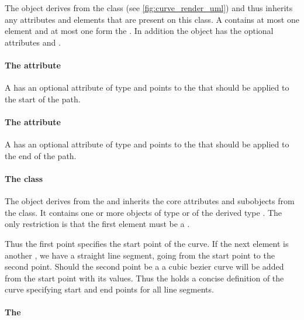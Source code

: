 The \RenderCurve object derives from the \GraphicalPrimitiveOneD class (see \ref{fig:curve_render_uml})
and thus inherits any attributes and elements that are present on this
class.
A \RenderCurve contains at most one \ListOfElements element and at most one  form the \LayoutPackage.
In addition the \RenderCurve object has the optional attributes  and .

\paragraph{The \fixttspace{} attribute}

A \RenderCurve has an optional attribute  of type
 and points to the \LineEnding that should be applied to the start of the path.

\paragraph{The \fixttspace{} attribute}

A \RenderCurve has an optional attribute  of type
 and points to the \LineEnding that should be applied to the end of the path.

\paragraph{The  class}
\label{listofelements-class}

The \ListOfElements object derives from the  and inherits
the core attributes and subobjects from the  class. It
contains one or more objects of type \RenderPoint or of the derived type \RenderCubicBezier. 
The only restriction is that the first element must be a \RenderPoint.

Thus the first point specifies the start point of the curve. If the next element 
is another \RenderPoint, we have a straight line segment, going from the start point 
to the second point. Should the second point be a \RenderCubicBezier a cubic bezier curve 
will be added from the start point with its values. Thus the \ListOfElements holds a concise
definition of the curve specifying start and end points for all line segments. 

\paragraph{The }

